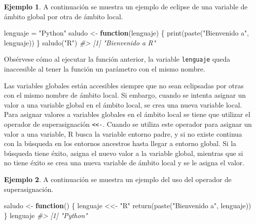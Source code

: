 \documentclass[
]{book}
\newenvironment{Shaded}{\begin{snugshade}}{\end{snugshade}}
\newcommand{\CommentTok}[1]{\textcolor[rgb]{0.56,0.35,0.01}{\textit{#1}}}
\newcommand{\ControlFlowTok}[1]{\textcolor[rgb]{0.13,0.29,0.53}{\textbf{#1}}}
\newcommand{\FunctionTok}[1]{\textcolor[rgb]{0.00,0.00,0.00}{#1}}
\newcommand{\NormalTok}[1]{#1}
\newcommand{\OtherTok}[1]{\textcolor[rgb]{0.56,0.35,0.01}{#1}}
\newcommand{\StringTok}[1]{\textcolor[rgb]{0.31,0.60,0.02}{#1}}
\theoremstyle{definition}
\theoremstyle{definition}
\newtheorem{example}{Ejemplo}[chapter]
\theoremstyle{definition}
\theoremstyle{definition}
\theoremstyle{remark}
\begin{document}
\begin{example}
A continuación se muestra un ejemplo de eclipse de una variable de ámbito global por otra de ámbito local.

\begin{Shaded}
\begin{Highlighting}[]
\NormalTok{lenguaje }\OtherTok{=} \StringTok{"Python"}
\NormalTok{saludo }\OtherTok{\textless{}{-}} \ControlFlowTok{function}\NormalTok{(lenguaje) \{}
  \FunctionTok{print}\NormalTok{(}\FunctionTok{paste}\NormalTok{(}\StringTok{"Bienvenido a"}\NormalTok{, lenguaje))  }
\NormalTok{\}}
\FunctionTok{saludo}\NormalTok{(}\StringTok{"R"}\NormalTok{)}
\CommentTok{\#\textgreater{} [1] "Bienvenido a R"}
\end{Highlighting}
\end{Shaded}

Obsérvese cómo al ejecutar la función anterior, la variable \texttt{lenguaje} queda inaccesible al tener la función un parámetro con el mismo nombre.
\end{example}

Las variables globales están accesibles siempre que no sean eclipsadas por otras con el mismo nombre de ámbito local. Si embargo, cuando se intenta asignar un valor a una variable global en el ámbito local, se crea una nueva variable local. Para asignar valores a variables globales en el ámbito local se tiene que utilizar el operador de superasignación \texttt{\textless{}\textless{}-}. Cuando se utiliza este operador para asignar un valor a una variable, R busca la variable entorno padre, y si no existe continua con la búsqueda en los entornos ancestros hasta llegar a entorno global. Si la búsqueda tiene éxito, asigna el nuevo valor a la variable global, mientras que si no tiene éxito se crea una nueva variable de ámbito local y se le asigna el valor.

\begin{example}

A continuación se muestra un ejemplo del uso del operador de superasignación.

\begin{Shaded}
\begin{Highlighting}[]
\NormalTok{saludo }\OtherTok{\textless{}{-}} \ControlFlowTok{function}\NormalTok{() \{}
\NormalTok{  lenguaje }\OtherTok{\textless{}\textless{}{-}} \StringTok{"R"}
  \FunctionTok{return}\NormalTok{(}\FunctionTok{paste}\NormalTok{(}\StringTok{"Bienvenido a"}\NormalTok{, lenguaje))}
\NormalTok{\}}
\NormalTok{lenguaje}
\CommentTok{\#\textgreater{} [1] "Python"}
\end{Highlighting}
\end{Shaded}

\end{example}
\end{document}
